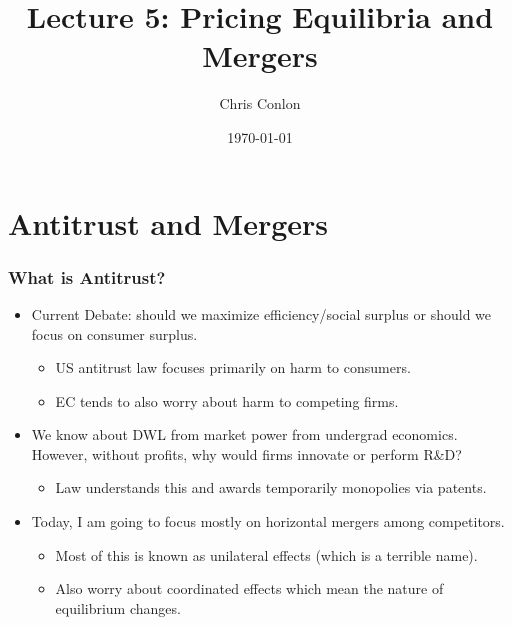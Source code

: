 \documentclass[xcolor=pdftex,dvipsnames,table,mathserif,aspectratio=169]{beamer}
\begin{document}
\title{Lecture 5: Pricing Equilibria and Mergers}
\author{Chris Conlon}
\date{\today}

\frame{\titlepage}

\section{Antitrust and Mergers}

\begin{frame}
\frametitle{What is Antitrust?}
 \begin{itemize}
\item Current Debate: should we maximize \alert{efficiency/social surplus} or should we focus on \alert{consumer surplus}.
\begin{itemize}
\item US antitrust law focuses primarily on harm to consumers.
\item EC tends to also worry about harm to competing firms.
 \end{itemize}
 \item We know about DWL from market power from undergrad economics. However, without profits, why would firms innovate or perform R\&D?
 \begin{itemize}
\item Law understands this and awards temporarily monopolies via patents.
 \end{itemize}
\item Today, I am going to focus mostly on \alert{horizontal mergers} among competitors.
\begin{itemize}
\item Most of this is known as \alert{unilateral effects} (which is a terrible name).
\item Also worry about \alert{coordinated effects} which mean the nature of equilibrium changes.
 \end{itemize}
 \end{itemize}
\end{frame}
\end{document}
